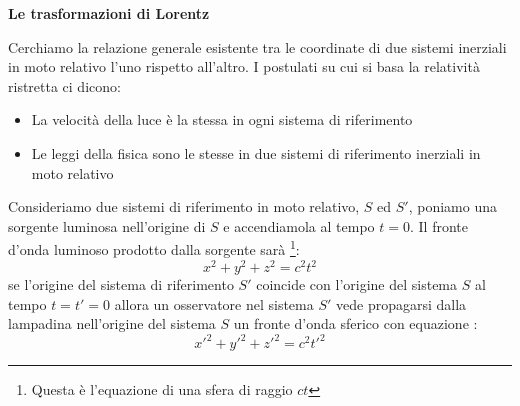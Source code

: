 \documentclass[a4paper,10pt,twoside]{article}
\begin{document}
\begin{center}
{\Large \textbf{Le trasformazioni di Lorentz}} 
\end{center}

\vspace{1cm}

Cerchiamo la relazione generale esistente tra le coordinate di due sistemi inerziali in moto relativo l'uno rispetto all'altro. I postulati su cui si basa la relatività ristretta ci dicono:
\begin{itemize}
\item La velocità della luce è la stessa in ogni sistema di riferimento
\item Le leggi della fisica sono le stesse in due sistemi di riferimento inerziali in moto relativo
\end{itemize}

Consideriamo due sistemi di riferimento in moto relativo, $S$ ed $S'$, poniamo una sorgente luminosa nell'origine di $S$ e accendiamola al tempo $t=0$. Il fronte d'onda luminoso prodotto dalla sorgente sarà \footnote{Questa è l'equazione di una sfera di raggio $ct$}:
\begin{equation}\label{fixed}
x^2+y^2+z^2=c^2t^2
\end{equation}
se l'origine del sistema di riferimento $S'$ coincide con l'origine del sistema $S$ al tempo $t=t'=0$ allora un osservatore nel sistema $S'$  vede propagarsi dalla lampadina nell'origine del sistema $S$ un fronte d'onda sferico con equazione :
\begin{equation}\label{move}
x'^2+y'^2+z'^2=c^2t'^2
\end{equation}
\end{document}

